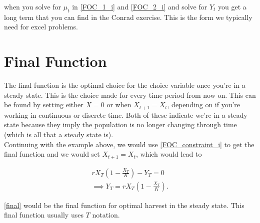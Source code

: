 \documentclass[12pt]{article}
\begin{document}
when you solve for $\mu_t$ in \ref{FOC_1_i} and \ref{FOC_2_i} and solve for $Y_t$ you get a long term that you can find in the Conrad exercise. This is the form we typically need for excel problems. 


\section{Final Function}
The final function is the optimal choice for the choice variable once you're in a steady state. This is the choice made for every time period from now on. This can be found by setting either $\dot X = 0$ or when $X_{t+1} = X_t$, depending on if you're working in continuous or discrete time. Both of these indicate we're in a steady state because they imply the population is no longer changing through time (which is all that a steady state is). \\

Continuing with the example above, we would use \ref{FOC_constraint_i} to get the final function and we would set $X_{t+1} = X_t$, which would lead to 

\begin{align}
    rX_T (1 - \frac{X_T}{K}) - Y_T = 0 \\
    \implies Y_T = rX_T (1 - \frac{X_T}{K}) \label{final}.
\end{align}

\ref{final} would be the final function for optimal harvest in the steady state. This final function usually uses $T$ notation.




\end{document}
